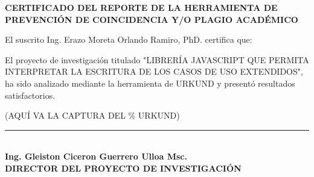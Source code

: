\begin{center}
	{\titulodc \textbf{CERTIFICADO DEL REPORTE DE LA HERRAMIENTA DE PREVENCIÓN DE COINCIDENCIA Y/O PLAGIO ACADÉMICO}}
\end{center}

El suscrito Ing. Erazo Moreta Orlando Ramiro, PhD. certifica que:

El proyecto de investigación titulado "LIBRERÍA JAVASCRIPT QUE PERMITA INTERPRETAR LA ESCRITURA DE LOS CASOS DE USO EXTENDIDOS", ha sido analizado mediante la herramienta de URKUND y presentó resultados satisfactorios.

\begin{center}
	(AQUÍ VA LA CAPTURA DEL \% URKUND) 
\end{center}

\begin{center}
	\vspace*{1.5in}
	\rule{8cm}{0.1mm} \\
	\textbf{Ing. Gleiston Ciceron Guerrero Ulloa Msc. \\
		DIRECTOR DEL PROYECTO DE INVESTIGACIÓN}
\end{center}